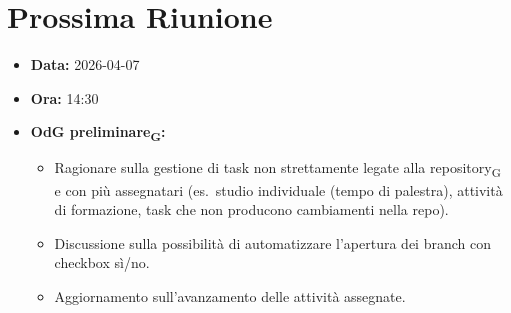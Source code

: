  
\section{Prossima Riunione}
\begin{itemize}
	\item \textbf{Data:} 2026-04-07
	\item \textbf{Ora:} 14:30
	\item \textbf{OdG preliminare\textsubscript{G}:}
	\begin{itemize}
		\item Ragionare sulla gestione di task non strettamente legate
		      alla repository\textsubscript{G} e con più assegnatari (es.\ studio individuale (tempo di palestra),
		      attività di formazione, task che non producono cambiamenti nella repo).
		\item Discussione sulla possibilità di automatizzare l'apertura
		      dei branch con checkbox sì/no.
		\item Aggiornamento sull'avanzamento delle attività assegnate.
	\end{itemize}
\end{itemize}